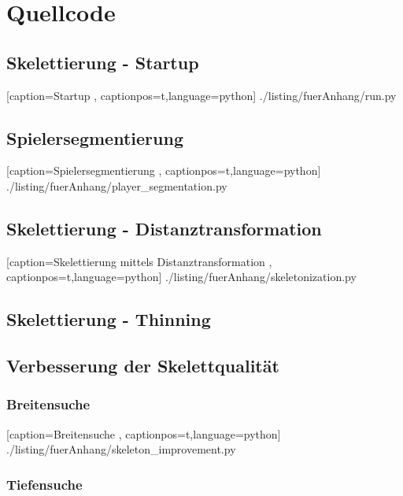 \chapter{Quellcode}
\label{anhang:quellcode}
\section{Skelettierung - Startup}
 
    [caption={Startup}
       \label{lst:startup},
       captionpos=t,language=python]
 {./listing/fuerAnhang/run.py}
\section{Spielersegmentierung}

    [caption={Spielersegmentierung}
       \label{lst:anhang_spielersegmentierung},
       captionpos=t,language=python]
 {./listing/fuerAnhang/player_segmentation.py}
\section{Skelettierung - Distanztransformation}

    [caption={Skelettierung mittels Distanztransformation}
       \label{lst:anhang_distanztransformation},
       captionpos=t,language=python]
 {./listing/fuerAnhang/skeletonization.py}
\section{Skelettierung - Thinning}
\section{Verbesserung der Skelettqualität}
\subsection{Breitensuche}
 
    [caption={Breitensuche}
       \label{lst:breitensuche},
       captionpos=t,language=python]
 {./listing/fuerAnhang/skeleton_improvement.py}
\subsection{Tiefensuche}